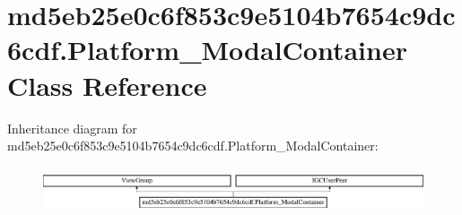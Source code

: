 \hypertarget{classmd5eb25e0c6f853c9e5104b7654c9dc6cdf_1_1Platform__ModalContainer}{}\section{md5eb25e0c6f853c9e5104b7654c9dc6cdf.\+Platform\+\_\+\+Modal\+Container Class Reference}
\label{classmd5eb25e0c6f853c9e5104b7654c9dc6cdf_1_1Platform__ModalContainer}
Inheritance diagram for md5eb25e0c6f853c9e5104b7654c9dc6cdf.\+Platform\+\_\+\+Modal\+Container\+:\begin{figure}[H]
\begin{center}
\leavevmode
\includegraphics[height=1.372549cm]{classmd5eb25e0c6f853c9e5104b7654c9dc6cdf_1_1Platform__ModalContainer}
\end{center}
\end{figure}
